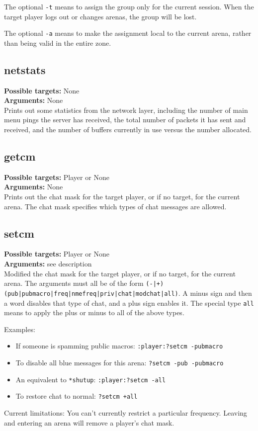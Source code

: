 \documentclass{article}
\newcommand{\targets}[1]{\noindent\textbf{Possible targets:} #1\\}
\newcommand{\args}[1]{\noindent\textbf{Arguments:} #1\\}
\begin{document}
The optional \verb/-t/ means to assign the group only for the current
session. When the target player logs out or changes arenas, the group
will be lost.

The optional \verb/-a/ means to make the assignment local to the current
arena, rather than being valid in the entire zone.

\subsection{netstats}
\targets{None}
\args{None}
Prints out some statistics from the network layer, including the number
of main menu pings the server has received, the total number of packets
it has sent and received, and the number of buffers currently in use
versus the number allocated.

\subsection{getcm}
\targets{Player or None}
\args{None}
Prints out the chat mask for the target player, or if no target, for the
current arena. The chat mask specifies which types of chat messages are
allowed.

\subsection{setcm}
\targets{Player or None}
\args{see description}
Modified the chat mask for the target player, or if no target, for the
current arena. The arguments must all be of the form
\texttt{(-|+)(pub|pubmacro|freq|nmefreq|priv|chat|modchat|all)}. A minus
sign and then a word disables that type of chat, and a plus sign enables
it. The special type \texttt{all} means to apply the plus or minus to
all of the above types.

Examples:
\begin{itemize}
\item If someone is spamming public macros: \verb/:player:?setcm -pubmacro/
\item To disable all blue messages for this arena: \verb/?setcm -pub -pubmacro/
\item An equivalent to \verb/*shutup/: \verb/:player:?setcm -all/
\item To restore chat to normal: \verb/?setcm +all/
\end{itemize}

Current limitations: You can't currently restrict a particular
frequency. Leaving and entering an arena will remove a player's chat
mask.
\end{document}
